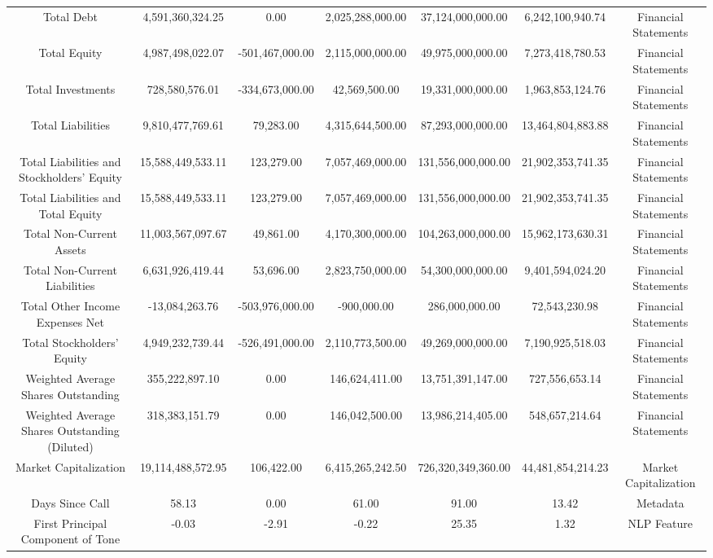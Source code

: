 \begin{longtable}{ccccccc}
Total Debt & 4,591,360,324.25 & 0.00 & 2,025,288,000.00 & 37,124,000,000.00 & 6,242,100,940.74 & Financial Statements \\
Total Equity & 4,987,498,022.07 & -501,467,000.00 & 2,115,000,000.00 & 49,975,000,000.00 & 7,273,418,780.53 & Financial Statements \\
Total Investments & 728,580,576.01 & -334,673,000.00 & 42,569,500.00 & 19,331,000,000.00 & 1,963,853,124.76 & Financial Statements \\
Total Liabilities & 9,810,477,769.61 & 79,283.00 & 4,315,644,500.00 & 87,293,000,000.00 & 13,464,804,883.88 & Financial Statements \\
Total Liabilities and Stockholders' Equity & 15,588,449,533.11 & 123,279.00 & 7,057,469,000.00 & 131,556,000,000.00 & 21,902,353,741.35 & Financial Statements \\
Total Liabilities and Total Equity & 15,588,449,533.11 & 123,279.00 & 7,057,469,000.00 & 131,556,000,000.00 & 21,902,353,741.35 & Financial Statements \\
Total Non-Current Assets & 11,003,567,097.67 & 49,861.00 & 4,170,300,000.00 & 104,263,000,000.00 & 15,962,173,630.31 & Financial Statements \\
Total Non-Current Liabilities & 6,631,926,419.44 & 53,696.00 & 2,823,750,000.00 & 54,300,000,000.00 & 9,401,594,024.20 & Financial Statements \\
Total Other Income Expenses Net & -13,084,263.76 & -503,976,000.00 & -900,000.00 & 286,000,000.00 & 72,543,230.98 & Financial Statements \\
Total Stockholders' Equity & 4,949,232,739.44 & -526,491,000.00 & 2,110,773,500.00 & 49,269,000,000.00 & 7,190,925,518.03 & Financial Statements \\
Weighted Average Shares Outstanding & 355,222,897.10 & 0.00 & 146,624,411.00 & 13,751,391,147.00 & 727,556,653.14 & Financial Statements \\
Weighted Average Shares Outstanding (Diluted) & 318,383,151.79 & 0.00 & 146,042,500.00 & 13,986,214,405.00 & 548,657,214.64 & Financial Statements \\
Market Capitalization & 19,114,488,572.95 & 106,422.00 & 6,415,265,242.50 & 726,320,349,360.00 & 44,481,854,214.23 & Market Capitalization \\
Days Since Call & 58.13 & 0.00 & 61.00 & 91.00 & 13.42 & Metadata \\
First Principal Component of Tone & -0.03 & -2.91 & -0.22 & 25.35 & 1.32 & NLP Feature \\

\end{longtable}
